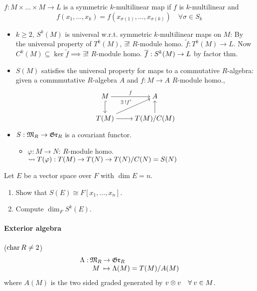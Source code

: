 \begin{definition}
  $f: M \times \dots \times M \to L$ is a symmetric $k$-multilinear map if
  $f$ is $k$-multilinear and
  \[ f(x_1, \dots, x_k) = f(x_{\sigma(1)}, \dots, x_{\sigma(k)}) \quad
  \forall \sigma \in S_k \]
  \begin{itemize}
    \item $k \ge 2$, $S^k(M)$ is universal w.r.t. symmetric $k$-multilinear
      maps on $M$:
      By the universal property of $T^k(M)$, $\exists!$ $R$-module homo.
      $\tilde{f}: T^k(M) \to L$. Now $C^k(M) \subseteq \ker \tilde{f}
      \implies \exists!$ $R$-module homo. $\overline{f}: S^k(M) \to L$ by
      factor thm.
    \item $S(M)$ satisfies the universal property for maps to a commutative
      $R$-algebra:
      given a commmutative $R$-algebra $A$ and $f:M \to A$ $R$-module homo.,
      \[
        \begin{tikzcd}[cramped]
          M \arrow{r}{f} \arrow[hook]{d} & A \\
          T(M) \arrow{ur}{\exists! f'}
          \arrow{r} & \quot{T(M)}{C(M)} \arrow{u}
        \end{tikzcd}
      \]
    \item $S: \mathfrak{M}_R \to \mathfrak{Gr}_R$ is a covariant functor.
      \begin{itemize}
        \item $\varphi: M \to N$: $R$-module homo. $\leadsto
          T(\varphi): T(M) \to T(N) \to {T(N)}/{C(N)} = S(N)$
      \end{itemize}
  \end{itemize}
\end{definition}

\begin{exercise}
  Let $E$ be a vector space over $F$ with $\dim E = n$.
  \begin{enumerate}
    \item Show that $S(E) \cong F[x_1, \dots, x_n]$.
    \item Compute $\dim_F S^k(E)$.
  \end{enumerate}
\end{exercise}

\paragraph{Exterior algebra} ($\operatorname{char} R \ne 2$)
\[
  \arraycolsep=1pt
  \begin{array}{rcl}
  \Lambda: & \Mf_R & \to \Grf_R \\
           & M & \mapsto \Lambda(M) = \quot{T(M)}{A(M)}
  \end{array}
\]
where $A(M)$ is the two sided graded generated by $v\Ot v \quad
\forall v \in M$.

